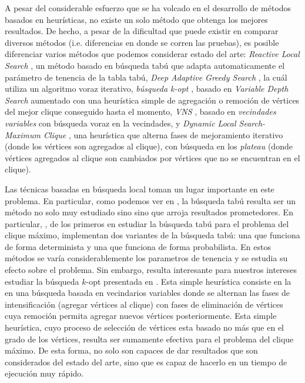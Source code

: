 \documentclass[conference]{IEEEtran}
\begin{document}
A pesar del considerable esfuerzo que se ha volcado en el desarrollo
de métodos basados en heurísticas, no existe un solo método que
obtenga los mejores resultados. De hecho, a pesar de la dificultad que
puede existir en comparar diversos métodos (i.e. diferencias en donde
se corren las pruebas), es posible diferenciar varios métodos que
podemos considerar estado del arte: \emph{Reactive Local Search}
\cite{rls}, un método basado en búsqueda tabú que adapta
automaticamente el parámetro de tenencia de la tabla tabú, \emph{Deep
  Adaptive Greedy Search} \cite{grosso}, la cuál utiliza un algoritmo
voraz iterativo, \emph{búsqueda k-opt} \cite{kopt}, basado en
\emph{Variable Depth Search} aumentado con una heurística simple de
agregación o remoción de vértices del mejor clique conseguido hasta el
momento, \emph{VNS} \cite{vns}, basado en \emph{vecindades
  variables} con búsqueda voraz en la vecindades, y \emph{Dynamic
  Local Search-Maximum Clique} \cite{dynamicl}, una heurística que
alterna fases de mejoramiento iterativo (donde los vértices son
agregados al clique), con búsqueda en los \emph{plateau} (donde
vértices agregados al clique son cambiados por vértices que no se
encuentran en el clique).

Las técnicas basadas en búsqueda local toman un lugar importante en
este problema. En particular, como podemos ver en \cite{old1, old2,
  multistart}, la búsqueda tabú resulta ser un método no solo muy
estudiado sino sino que arroja resultados prometedores. En particular,
\cite{old1, old2}, de los primeros en estudiar la búsqueda tabú para
el problema del clique máximo, implementan dos variantes de la
búsqueda tabú: una que funciona de forma determinista y una que
funciona de forma probabilista. En estos métodos se varía
considerablemente los parametros de tenencia y se estudia su efecto
sobre el problema. Sin embargo, resulta interesante para nuestros
intereses estudiar la búsqueda $k$-opt presentada en \cite{kopt}. Esta
simple heurística consiste en la en una búsqueda basada en vecindarios
variables donde se alternan las fases de intensificación (agregar
vértices al clique) con fases de eliminación de vértices cuya remoción
permita agregar nuevos vértices posteriormente. Esta simple
heurística, cuyo proceso de selección de vértices esta basado no más
que en el grado de los vértices, resulta ser sumamente efectiva para
el problema del clique máximo. De esta forma, no solo son capaces de
dar resultados que son considerados del estado del arte, sino que es
capaz de hacerlo en un tiempo de ejecución muy rápido.
\end{document}
